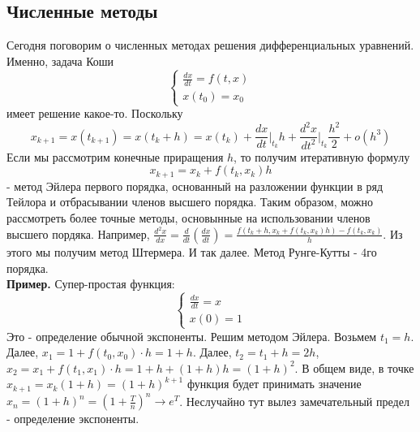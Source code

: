 \subsection{Численные методы}
Сегодня поговорим о численных методах решения дифференциальных уравнений.
Именно, задача Коши
$$\begin{cases}
    \frac{dx}{dt}=f(t,x)\\x(t_0)=x_0
\end{cases}$$ 
имеет решение какое-то. 
Поскольку 
$$x_{k+1}=x(t_{k+1})=x(t_k+h)=x(t_k)+\frac{dx}{dt}\big|_{t_k}h+
\frac{d^2x}{dt^2}\big|_{t_k}\frac{h^2}{2}+o(h^3)$$
Если мы рассмотрим конечные приращения $h$, то 
получим  итеративную формулу 
$$x_{k+1}=x_k+f(t_k,x_k)h$$ 
- метод Эйлера первого порядка, основанный на разложении функции в ряд Тейлора
и отбрасывании членов высшего порядка. Таким образом, можно рассмотреть
более точные методы, основынные на использовании членов высшего пордяка.
Например, $\frac{d^2x}{dx}=\frac{d}{dt}\left( \frac{dx}{dt} \right)=
\frac{f(t_k+h,x_k+f(t_k,x_k)h)-f(t_k,x_k)}{h}$. Из этого мы получим 
метод Штермера. И так далее. Метод  Рунге-Кутты - 4го порядка.\\
\textbf{Пример.} Супер-простая функция:
$$\begin{cases}
    \frac{dx}{dt}=x\\x(0)=1
\end{cases}$$
Это - определение обычной экспоненты. Решим методом Эйлера. Возьмем
$t_1=h$. Далее,  $x_1=1+f(t_0,x_0)\cdot h=1+h$. Далее,
 $t_2=t_1+h=2h$, $x_2=x_1+f(t_1,x_1)\cdot h=1+h+(1+h)h=(1+h)^2$.
 В общем виде, в точке $x_{k+1}=x_k(1+h)=(1+h)^{k+1}$ 
 функция будет принимать значение $x_n=(1+h)^{n}=\left( 1+\frac{T}{n}\right)^n
\to e^T$.
Неслучайно тут вылез замечательный предел - определение экспоненты.


